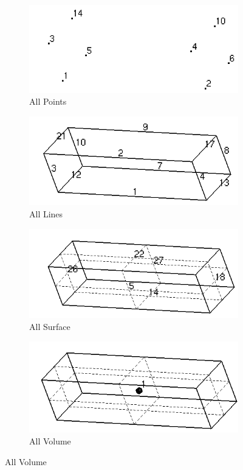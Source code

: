 \documentclass[11pt]{article}
\begin{document}
\begin{figure}[h]

  \centering
  \begin{subfigure}[b]{0.35\textwidth}
    \includegraphics[width=\textwidth]{Images/Points.png}
    \caption{All Points}
  \end{subfigure}
  \begin{subfigure}[b]{0.35\textwidth}
    \includegraphics[width=\textwidth]{Images/Lines.png}
    \caption{All Lines}
  \end{subfigure}

  \begin{subfigure}[b]{0.35\textwidth}
    \includegraphics[width=\textwidth]{Images/Surface.png} 
    \caption{All Surface}
  \end{subfigure}
  \begin{subfigure}[b]{0.35\textwidth}
    \includegraphics[width=\textwidth]{Images/Volume.png}
    \caption{All Volume}
  \end{subfigure}


\end{figure}
\end{document}
